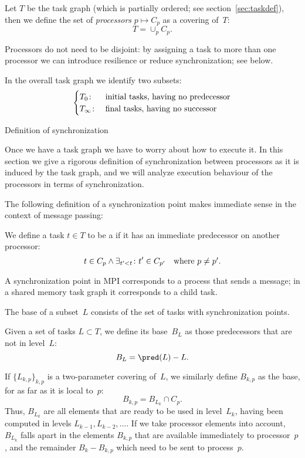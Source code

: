 \begin{definition}
  \label{def:processors}
  Let $T$ be the task graph (which is partially ordered; see section~\ref{sec:taskdef}),
  then we define the set of \emph{processors}
  $p\mapsto C_p$ as a covering of~$T$:
  \[ T = \cup_p C_p. \]
\end{definition}
Processors do not need to be disjoint: by assigning a task to more than one processor
we can introduce resilience or reduce synchronization; see below.

In the overall task graph we identify two subsets:
\[
\begin{cases}
  T_0\colon&\hbox{initial tasks, having no predecessor}\\
  T_\infty\colon&\hbox{final tasks, having no successor}
\end{cases}
\]

 {Definition of synchronization}

Once we have a task graph we have to worry about how to execute it.
In this section we give a rigorous definition of synchronization between processors
as it is induced by the task graph, and we will analyze execution behaviour
of the processors in terms of synchronization.

The following definition of a synchronization point
makes immediate sense in the context of message passing:

\begin{definition}
  We define a task $t\in T$ to be a  if
  it has an immediate predecessor on another processor:
  \[ t\in C_p \wedge \exists_{t'<t}\colon  t'\in C_{p'}
     \quad\hbox{where $p\not=p'$}. \]
\end{definition}
A synchronization point in MPI corresponds to a process that sends a message; in a shared memory task
graph it corresponds to a child task.

The base of a subset~$L$ consists of the set of tasks with synchronization points.

\begin{definition}
  Given a set of tasks $L\subset T$, we define its base~$B_L$ as
  those predecessors that are not in level~$L$:
  \[ B_L = \pred(L) - L. \]
\end{definition}
If $\{L_{k,p}\}_{k,p}$ is a two-parameter covering of~$L$,
we similarly define $B_{k,p}$ as the base, for as far as it is local to~$p$:
\[ B_{k,p} = B_{L_k} \cap C_p. \]
Thus, $B_{L_k}$ are all elements that are ready to be used in
level~$L_k$, having been computed in levels $L_{k-1},L_{k-2},\ldots$.
If we take processor elements into account, $B_{L_k}$ falls apart in the
elements $B_{k,p}$ that are available immediately to processor~$p$,
and the remainder $B_k-B_{k,p}$ which need to be sent to process~$p$.


